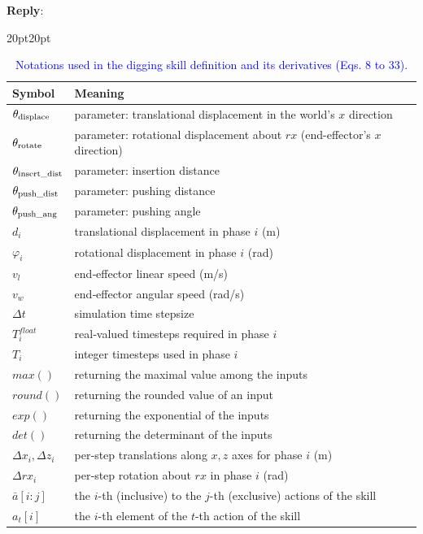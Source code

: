 \documentclass[11pt]{article}
\newenvironment{reply}
   {\medskip \noindent \begin{sf}\textbf{Reply}: \  }
   {\medskip \end{sf}}
\newcommand{\xt}[1]{\textcolor{blue}{#1}}
\begin{document}
\begin{reply}
\begin{adjustwidth}{20pt}{20pt}
\begin{table}[h]
\small
\centering
\begin{tabular}{>{\color{blue}}l>{\color{blue}}l}
\toprule
\textbf{Symbol} & \textbf{Meaning} \\
\midrule
$\theta_{\rm displace}$       & parameter: translational displacement in the world's $x$ direction \\
$\theta_{\rm rotate}$         & parameter: rotational displacement about $rx$ (end-effector's $x$ direction) \\
$\theta_{\rm insert\_dist}$   & parameter: insertion distance \\
$\theta_{\rm push\_dist}$     & parameter: pushing distance \\
$\theta_{\rm push\_ang}$      & parameter: pushing angle \\
$d_i$                         & translational displacement in phase $i$ (m) \\
$\varphi_i$                   & rotational displacement in phase $i$ (rad) \\
$v_l$                         & end‐effector linear speed (m/s) \\
$v_w$                         & end‐effector angular speed (rad/s) \\
$\Delta t$                    & simulation time stepsize\\
$T^{float}_i$                 & real‐valued timesteps required in phase $i$\\
$T_{i}$                       & integer timesteps used in phase $i$ \\
$max()$                       & returning the maximal value among the inputs\\
$round()$                     & returning the rounded value of an input\\
$exp()$                       & returning the exponential of the inputs\\
$det()$                       & returning the determinant of the inputs\\
$\Delta x_i,\Delta z_i$       & per‐step translations along $x,z$ axes for phase $i$ (m) \\
$\Delta rx_i$                 & per‐step rotation about $rx$ in phase $i$ (rad) \\
$\bar{a}[i:j]$                & the $i$-th (inclusive) to the $j$-th (exclusive) actions of the skill\\
$a_t[i]$                      & the $i$-th element of the $t$-th action of the skill\\
\bottomrule
\end{tabular}
\caption{\xt{Notations used in the digging skill definition and its derivatives (Eqs. 8 to 33).}}\label{tab:skill-notation}
\end{table}


\end{adjustwidth}
\end{reply}
\end{document}
